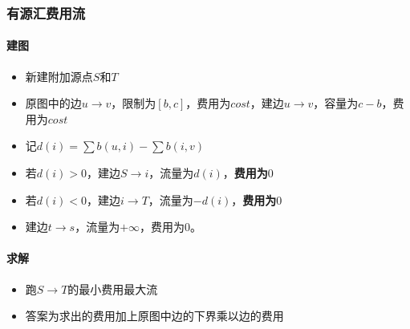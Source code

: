 \subsubsection*{有源汇费用流}
\paragraph{建图}
\begin{itemize}
\item 新建附加源点$S$和$T$
\item 原图中的边$u \rightarrow v$，限制为$[b,c]$，费用为$cost$，建边$u \rightarrow v$，容量为$c-b$，费用为$cost$
\item 记$d(i) = \sum b(u,i) - \sum b(i,v) $
\item 若$d(i)>0$，建边$S \rightarrow i$，流量为$d(i)$，\textbf{费用为$0$}
\item 若$d(i)<0$，建边$i \rightarrow T$，流量为$-d(i)$，\textbf{费用为$0$}
\item 建边$t \rightarrow s$，流量为$+\infty$，费用为$0$。
\end{itemize}

\paragraph{求解}
\begin{itemize}
\item 跑$S \rightarrow T$的最小费用最大流
\item 答案为求出的费用加上原图中边的下界乘以边的费用
\end{itemize}
